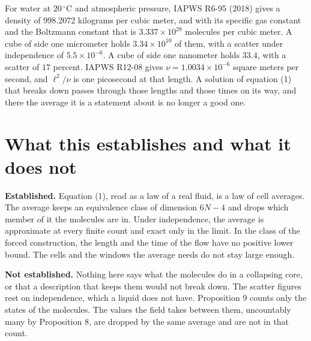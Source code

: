 For water at $20\,^\circ$C and atmospheric pressure, IAPWS R6-95 (2018) gives a density of
998.2072 kilograms per cubic meter, and with its specific gas constant and the Boltzmann constant
that is $3.337\times 10^{28}$ molecules per cubic meter. A cube of side one micrometer holds
$3.34\times 10^{10}$ of them, with a scatter under independence of $5.5\times 10^{-6}$. A cube of
side one nanometer holds $33.4$, with a scatter of $17$ percent. IAPWS R12-08 gives
$\nu = 1.0034\times 10^{-6}$ square meters per second, and $\ell^2/\nu$ is one picosecond at that
length. A solution of equation (1) that breaks down passes through
those lengths and those times on its way, and there the average it is a statement about is no
longer a good one.

\section{What this establishes and what it does not}

\textbf{Established.} Equation (1), read as a law of a real fluid, is a law of cell averages. The
average keeps an equivalence class of dimension $6N-4$ and drops which member of it the molecules
are in. Under independence, the average is approximate at every finite count and exact only in the
limit. In the class of the forced construction, the length and the time of the flow have no
positive lower bound. The cells and the windows the average needs do not stay large enough.

\textbf{Not established.} Nothing here says what the molecules do in a collapsing core, or that a
description that keeps them would not break down. The scatter figures rest on independence, which
a liquid does not have. Proposition 9 counts only the states of the molecules. The values the field
takes between them, uncountably many by Proposition 8, are dropped by the same average and are not
in that count.
